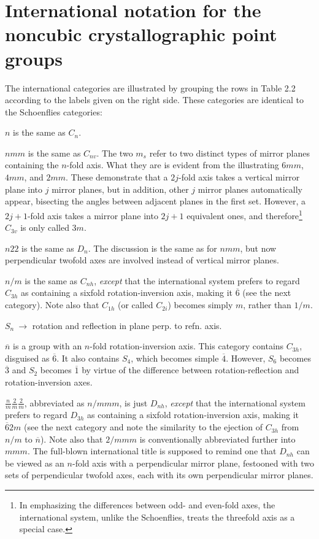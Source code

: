 \section*{International notation for the noncubic crystallographic point groups}

The international categories are illustrated by grouping the rows in Table 2.2 according to the labels given on the right side. These categories are identical to the Schoenflies categories:

$n$ is the same as $C_{n}$.

$nmm$ is the same as $C_{nv}$. The two $m_{s}$ refer to two distinct types of mirror planes containing the $n$-fold axis. What they are is evident from the illustrating $6mm$, $4mm$, and $2mm$. These demonstrate that a $2j$-fold axis takes a vertical mirror plane into $j$ mirror planes, but in addition, other $j$ mirror planes automatically appear, bisecting the angles between adjacent planes in the first set. However, a $2j+1$-fold axis takes a mirror plane into $2j+1$ equivalent ones, and therefore\footnote{In emphasizing the differences between odd- and even-fold axes, the international system, unlike the Schoenflies, treats the threefold axis as a special case.} $C_{3v}$ is only called $3m$.

$n22$ is the same as $D_{n}$. The discussion is the same as for $nmm$, but now perpendicular twofold axes are involved instead of vertical mirror planes.

$n/m$ is the same as $C_{nh}$, {\em except} that the international system prefers to regard $C_{3h}$ as containing a sixfold rotation-inversion axis, making it $\overline{6}$ (see the next category). Note also that $C_{1h}$ (or called $C_{2i}$) becomes simply $m$, rather than $1/m$.

$S_{n} \ \to$ rotation and reflection in plane perp. to refn. axis.

$\overline{n}$ is a group with an $n$-fold rotation-inversion axis. This category contains $C_{3h}$, disguised as $\overline{6}$. It also contains $S_{4}$, which becomes simple $\overline{4}$. However, $S_{6}$ becomes $\overline{3}$ and $S_{2}$ becomes $\overline{1}$ by virtue of the difference between rotation-reflection and rotation-inversion axes.

$\frac{n}{m}\frac{2}{m}\frac{2}{m}$, abbreviated as $n/mmm$, is just $D_{nh}$, {\em except} that the international system prefers to regard $D_{3h}$ as containing a sixfold rotation-inversion axis, making it $\overline{6}2m$ (see the next category and note the similarity to the ejection of $C_{3h}$ from $n/m$ to $\overline{n}$). Note also that $2/mmm$ is conventionally abbreviated further into $mmm$. The full-blown international title is supposed to remind one that $D_{nh}$ can be viewed as an $n$-fold axis with a perpendicular mirror plane, festooned with two sets of perpendicular twofold axes, each with its own perpendicular mirror planes.

